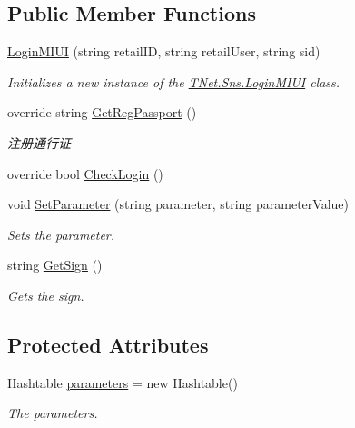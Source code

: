 \subsection*{Public Member Functions}
\begin{DoxyCompactItemize}
\item 
\mbox{\hyperlink{class_t_net_1_1_sns_1_1_login_m_i_u_i_a9f54158784f94ca993e9310f9d757eda}{Login\+M\+I\+UI}} (string retail\+ID, string retail\+User, string sid)
\begin{DoxyCompactList}\small\item\em Initializes a new instance of the \mbox{\hyperlink{class_t_net_1_1_sns_1_1_login_m_i_u_i}{T\+Net.\+Sns.\+Login\+M\+I\+UI}} class. \end{DoxyCompactList}\item 
override string \mbox{\hyperlink{class_t_net_1_1_sns_1_1_login_m_i_u_i_a600a638293acdeb2e299f047b7f339f5}{Get\+Reg\+Passport}} ()
\begin{DoxyCompactList}\small\item\em 注册通行证 \end{DoxyCompactList}\item 
override bool \mbox{\hyperlink{class_t_net_1_1_sns_1_1_login_m_i_u_i_adcc9f0d697a5d8b1dece2f44028d8301}{Check\+Login}} ()
\item 
void \mbox{\hyperlink{class_t_net_1_1_sns_1_1_login_m_i_u_i_a6eaebbb32e8dbd9425c792a0e42274b2}{Set\+Parameter}} (string parameter, string parameter\+Value)
\begin{DoxyCompactList}\small\item\em Sets the parameter. \end{DoxyCompactList}\item 
string \mbox{\hyperlink{class_t_net_1_1_sns_1_1_login_m_i_u_i_a17398cc72d275ef6ea9c866cc25c77d3}{Get\+Sign}} ()
\begin{DoxyCompactList}\small\item\em Gets the sign. \end{DoxyCompactList}\end{DoxyCompactItemize}
\subsection*{Protected Attributes}
\begin{DoxyCompactItemize}
\item 
Hashtable \mbox{\hyperlink{class_t_net_1_1_sns_1_1_login_m_i_u_i_a3d088b38f50219c528a2df58a8eed51e}{parameters}} = new Hashtable()
\begin{DoxyCompactList}\small\item\em The parameters. \end{DoxyCompactList}\end{DoxyCompactItemize}
